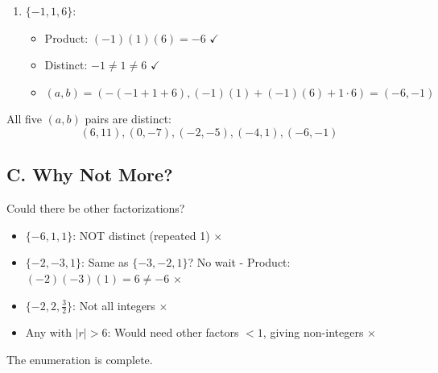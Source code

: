 \documentclass[12pt]{article}
\begin{document}
\begin{solutionbox}
\begin{enumerate}
    \item \textbf{$\{-1, 1, 6\}$}:
    \begin{itemize}
        \item Product: $(-1)(1)(6) = -6$ $\checkmark$
        \item Distinct: $-1 \neq 1 \neq 6$ $\checkmark$
        \item $(a,b) = (-(-1+1+6), (-1)(1)+(-1)(6)+1 \cdot 6) = (-6, -1)$
    \end{itemize}
\end{enumerate}

All five $(a,b)$ pairs are distinct:
$$(6, 11), (0, -7), (-2, -5), (-4, 1), (-6, -1)$$

\subsection*{C. Why Not More?}

Could there be other factorizations?

\begin{itemize}
    \item $\{-6, 1, 1\}$: NOT distinct (repeated 1) $\times$
    \item $\{-2, -3, 1\}$: Same as $\{-3, -2, 1\}$? No wait - Product: $(-2)(-3)(1) = 6 \neq -6$ $\times$
    \item $\{-2, 2, \frac{3}{2}\}$: Not all integers $\times$
    \item Any with $|r| > 6$: Would need other factors $< 1$, giving non-integers $\times$
\end{itemize}

The enumeration is complete.
\end{solutionbox}
\end{document}
